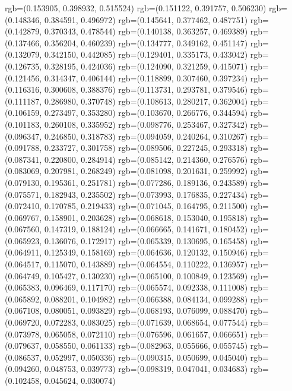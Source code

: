 {{{					rgb=(0.153905, 0.398932, 0.515524)
					rgb=(0.151122, 0.391757, 0.506230)
					rgb=(0.148346, 0.384591, 0.496972)
					rgb=(0.145641, 0.377462, 0.487751)
					rgb=(0.142879, 0.370343, 0.478544)
					rgb=(0.140138, 0.363257, 0.469389)
					rgb=(0.137466, 0.356204, 0.460239)
					rgb=(0.134777, 0.349162, 0.451147)
					rgb=(0.132079, 0.342150, 0.442085)
					rgb=(0.129401, 0.335173, 0.433042)
					rgb=(0.126735, 0.328195, 0.424036)
					rgb=(0.124090, 0.321259, 0.415071)
					rgb=(0.121456, 0.314347, 0.406144)
					rgb=(0.118899, 0.307460, 0.397234)
					rgb=(0.116316, 0.300608, 0.388376)
					rgb=(0.113731, 0.293781, 0.379546)
					rgb=(0.111187, 0.286980, 0.370748)
					rgb=(0.108613, 0.280217, 0.362004)
					rgb=(0.106159, 0.273497, 0.353280)
					rgb=(0.103670, 0.266776, 0.344594)
					rgb=(0.101183, 0.260108, 0.335952)
					rgb=(0.098776, 0.253467, 0.327342)
					rgb=(0.096347, 0.246850, 0.318783)
					rgb=(0.094059, 0.240264, 0.310267)
					rgb=(0.091788, 0.233727, 0.301758)
					rgb=(0.089506, 0.227245, 0.293318)
					rgb=(0.087341, 0.220800, 0.284914)
					rgb=(0.085142, 0.214360, 0.276576)
					rgb=(0.083069, 0.207981, 0.268249)
					rgb=(0.081098, 0.201631, 0.259992)
					rgb=(0.079130, 0.195361, 0.251781)
					rgb=(0.077286, 0.189136, 0.243589)
					rgb=(0.075571, 0.182943, 0.235502)
					rgb=(0.073993, 0.176835, 0.227434)
					rgb=(0.072410, 0.170785, 0.219433)
					rgb=(0.071045, 0.164795, 0.211500)
					rgb=(0.069767, 0.158901, 0.203628)
					rgb=(0.068618, 0.153040, 0.195818)
					rgb=(0.067560, 0.147319, 0.188124)
					rgb=(0.066665, 0.141671, 0.180452)
					rgb=(0.065923, 0.136076, 0.172917)
					rgb=(0.065339, 0.130695, 0.165458)
					rgb=(0.064911, 0.125349, 0.158169)
					rgb=(0.064636, 0.120132, 0.150946)
					rgb=(0.064517, 0.115070, 0.143889)
					rgb=(0.064554, 0.110222, 0.136957)
					rgb=(0.064749, 0.105427, 0.130230)
					rgb=(0.065100, 0.100849, 0.123569)
					rgb=(0.065383, 0.096469, 0.117170)
					rgb=(0.065574, 0.092338, 0.111008)
					rgb=(0.065892, 0.088201, 0.104982)
					rgb=(0.066388, 0.084134, 0.099288)
					rgb=(0.067108, 0.080051, 0.093829)
					rgb=(0.068193, 0.076099, 0.088470)
					rgb=(0.069720, 0.072283, 0.083025)
					rgb=(0.071639, 0.068654, 0.077544)
					rgb=(0.073978, 0.065058, 0.072110)
					rgb=(0.076596, 0.061657, 0.066651)
					rgb=(0.079637, 0.058550, 0.061133)
					rgb=(0.082963, 0.055666, 0.055745)
					rgb=(0.086537, 0.052997, 0.050336)
					rgb=(0.090315, 0.050699, 0.045040)
					rgb=(0.094260, 0.048753, 0.039773)
					rgb=(0.098319, 0.047041, 0.034683)
					rgb=(0.102458, 0.045624, 0.030074)
}}}
